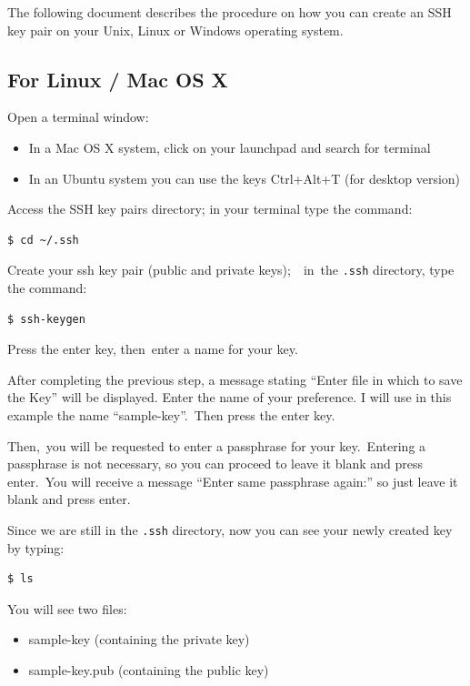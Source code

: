 The following document describes the procedure on how you can create an
SSH key pair on your Unix, Linux or Windows operating system.

\subsection{For Linux / Mac OS X}\label{for-linux-mac-os-x}

Open a terminal window:

\begin{itemize}
\tightlist
\item
  In a Mac OS X system, click on your launchpad and search for terminal
\item
  In an Ubuntu system you can use the keys Ctrl+Alt+T (for desktop
  version)
\end{itemize}

Access the SSH key pairs directory; {i}n your terminal type the command:

\begin{verbatim}
$ cd ~/.ssh
\end{verbatim}

Create your ssh key pair (public and private keys);~~in~the
\texttt{.ssh} directory, type the command:

\begin{verbatim}
$ ssh-keygen
\end{verbatim}

Press the enter key, then~enter a name for your key.

After completing the previous step, a message stating ``Enter file in
which to save the Key'' will be displayed. Enter the name of your
preference. I will use in this example the name ``sample-key''.{~}Then
press the enter key.

{Then,~}you will be requested to enter a passphrase for your
key.~Entering a passphrase is not necessary, so you can proceed to leave
it blank and press enter.{~}You will receive a message ``Enter same
passphrase again:'' so just leave it blank and press enter.

Since we are still in the \texttt{.ssh} directory, now you can see your
newly created key by typing:

\begin{verbatim}
$ ls
\end{verbatim}

You will see two files:

\begin{itemize}
\tightlist
\item
  sample-key (containing the private key)
\item
  sample-key.pub (containing the public key)
\end{itemize}

